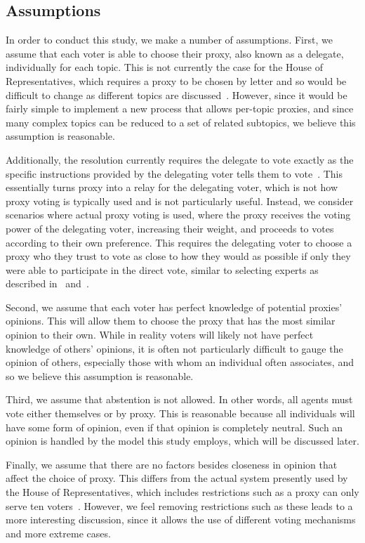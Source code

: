 \subsection{Assumptions}\label{subsec:assumptions}
In order to conduct this study, we make a number of assumptions.
First, we assume that each voter is able to choose their proxy, also known as a
delegate, individually for each topic.
This is not currently the case for the House of Representatives, which requires
a proxy to be chosen by letter and so would be difficult to change as different
topics are discussed~\cite{Congress.gov2020}.
However, since it would be fairly simple to implement a new process that allows
per-topic proxies, and since many complex topics can be reduced to a set of related
subtopics, we believe this assumption is reasonable.

Additionally, the resolution currently requires the delegate to vote exactly as the
specific instructions provided by the delegating voter tells them to
vote~\cite{CERP2020, Congress.gov2020}.
This essentially turns proxy into a relay for the delegating voter, which is not how
proxy voting is typically used and is not particularly useful.
Instead, we consider scenarios where actual proxy voting is used, where the proxy
receives the voting power of the delegating voter, increasing their weight, and
proceeds to votes according to their own preference.
This requires the delegating voter to choose a proxy who they trust to vote as close
to how they would as possible if only they were able to participate in the direct vote,
similar to selecting experts as described in~\cite{Miller1969} and~\cite{Mueller1972}.

Second, we assume that each voter has perfect knowledge of potential proxies' opinions.
This will allow them to choose the proxy that has the most similar opinion to their own.
While in reality voters will likely not have perfect knowledge of others' opinions,
it is often not particularly difficult to gauge the opinion of others, especially
those with whom an individual often associates, and so we believe this assumption is
reasonable.

Third, we assume that abstention is not allowed.
In other words, all agents must vote either themselves or by proxy.
This is reasonable because all individuals will have some form of opinion, even if
that opinion is completely neutral.
Such an opinion is handled by the model this study employs, which will be discussed
later.

Finally, we assume that there are no factors besides closeness in opinion that affect
the choice of proxy.
This differs from the actual system presently used by the House of Representatives,
which includes restrictions such as a proxy can only serve ten voters~\cite{CERP2020}.
However, we feel removing restrictions such as these leads to a more interesting
discussion, since it allows the use of different voting mechanisms and more extreme
cases.


